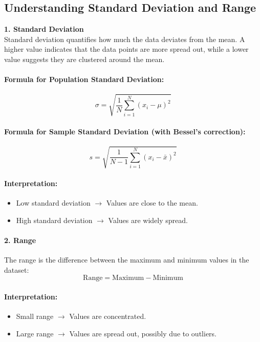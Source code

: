 \subsection*{Understanding Standard Deviation and Range}

\textbf{1. Standard Deviation}\\

Standard deviation quantifies how much the data deviates from the mean. A higher value indicates that the data points are more spread out, while a lower value suggests they are clustered around the mean.

\paragraph{Formula for Population Standard Deviation:}
\[
\sigma = \sqrt{\frac{1}{N} \sum_{i=1}^N (x_i - \mu)^2}
\]

\paragraph{Formula for Sample Standard Deviation (with Bessel’s correction):}
\[
s = \sqrt{\frac{1}{N-1} \sum_{i=1}^N (x_i - \bar{x})^2}
\]

\paragraph{Interpretation:}
\begin{itemize}
  \item Low standard deviation \(\rightarrow\) Values are close to the mean.
  \item High standard deviation \(\rightarrow\) Values are widely spread.
\end{itemize}

\paragraph{2. Range}

The range is the difference between the maximum and minimum values in the dataset:
\[
\text{Range} = \text{Maximum} - \text{Minimum}
\]

\paragraph{Interpretation:}
\begin{itemize}
  \item Small range \(\rightarrow\) Values are concentrated.
  \item Large range \(\rightarrow\) Values are spread out, possibly due to outliers.
\end{itemize}


